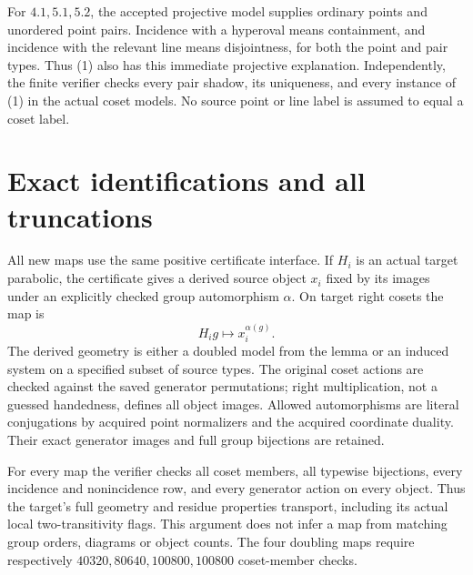 \documentclass[11pt]{article}
\begin{document}
For $4.1,5.1,5.2$, the accepted projective model supplies ordinary
points and unordered point pairs. Incidence with a hyperoval means
containment, and incidence with the relevant line means disjointness,
for both the point and pair types. Thus (1) also has this immediate
projective explanation. Independently, the finite verifier checks every
pair shadow, its uniqueness, and every instance of (1) in the actual
coset models. No source point or line label is assumed to equal a
coset label.

\section{Exact identifications and all truncations}
All new maps use the same positive certificate interface. If $H_i$ is
an actual target parabolic, the certificate gives a derived source
object $x_i$ fixed by its images under an explicitly checked group
automorphism $\alpha$. On target right cosets the map is
\[
                         H_i g\longmapsto x_i^{\alpha(g)}.
\]
The derived geometry is either a doubled model from the lemma or an
induced system on a specified subset of source types. The original
coset actions are checked against the saved generator permutations;
right multiplication, not a guessed handedness, defines all object
images. Allowed automorphisms are literal conjugations by acquired
point normalizers and the acquired coordinate duality. Their exact
generator images and full group bijections are retained.

For every map the verifier checks all coset members, all typewise
bijections, every incidence and nonincidence row, and every generator
action on every object. Thus the target's full geometry and residue
properties transport, including its actual local two-transitivity
flags. This argument does not infer a map from matching group orders,
diagrams or object counts. The four doubling maps require respectively
$40320,80640,100800,100800$ coset-member checks.
\end{document}
